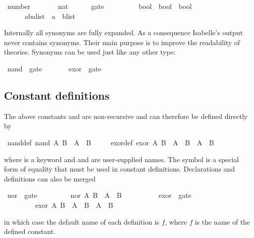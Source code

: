 %
\begin{isabellebody}%
\ number\ \ \ \ \ \ \ {\isacharequal}\ nat\isanewline
\ \ \ \ \ \ gate\ \ \ \ \ \ \ \ \ {\isacharequal}\ {\isachardoublequote}bool\ {\isasymRightarrow}\ bool\ {\isasymRightarrow}\ bool{\isachardoublequote}\isanewline
\ \ \ \ \ \ {\isacharparenleft}{\isacharprime}a{\isacharcomma}{\isacharprime}b{\isacharparenright}alist\ {\isacharequal}\ {\isachardoublequote}{\isacharparenleft}{\isacharprime}a\ {\isacharasterisk}\ {\isacharprime}b{\isacharparenright}list{\isachardoublequote}%
\begin{isamarkuptext}%
\noindent{}%
Internally all synonyms are fully expanded.  As a consequence Isabelle's
output never contains synonyms.  Their main purpose is to improve the
readability of theories.  Synonyms can be used just like any other
type:%
\end{isamarkuptext}%
\ nand\ {\isacharcolon}{\isacharcolon}\ gate\isanewline
\ \ \ \ \ \ \ exor\ {\isacharcolon}{\isacharcolon}\ gate%
\begin{isamarkuptext}%
\subsection{Constant definitions}
\label{sec:ConstDefinitions}

The above constants  and  are non-recursive and can
therefore be defined directly by%
\end{isamarkuptext}%
\ nand{\isacharunderscore}def{\isacharcolon}\ {\isachardoublequote}nand\ A\ B\ {\isasymequiv}\ {\isasymnot}{\isacharparenleft}A\ {\isasymand}\ B{\isacharparenright}{\isachardoublequote}\isanewline
\ \ \ \ \ exor{\isacharunderscore}def{\isacharcolon}\ {\isachardoublequote}exor\ A\ B\ {\isasymequiv}\ A\ {\isasymand}\ {\isasymnot}B\ {\isasymor}\ {\isasymnot}A\ {\isasymand}\ B{\isachardoublequote}%
\begin{isamarkuptext}%
\noindent%
where  is a keyword and
 and  are user-supplied names.
The symbol  is a special form of equality
that must be used in constant definitions.
Declarations and definitions can also be merged%
\end{isamarkuptext}%
\ nor\ {\isacharcolon}{\isacharcolon}\ gate\isanewline
\ \ \ \ \ \ \ \ \ {\isachardoublequote}nor\ A\ B\ {\isasymequiv}\ {\isasymnot}{\isacharparenleft}A\ {\isasymor}\ B{\isacharparenright}{\isachardoublequote}\isanewline
\ \ \ \ \ \ \ \ \ \ exor\ {\isacharcolon}{\isacharcolon}\ gate\isanewline
\ \ \ \ \ \ \ \ \ {\isachardoublequote}exor\ A\ B\ {\isasymequiv}\ {\isacharparenleft}A\ {\isasymor}\ B{\isacharparenright}\ {\isasymand}\ {\isacharparenleft}{\isasymnot}A\ {\isasymor}\ {\isasymnot}B{\isacharparenright}{\isachardoublequote}%
\begin{isamarkuptext}%
\noindent{}%
in which case the default name of each definition is $f$, where
$f$ is the name of the defined constant.%
\end{isamarkuptext}%
\end{isabellebody}%
